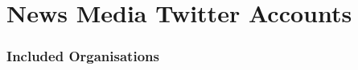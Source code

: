 \chapter{News Media Twitter Accounts\label{app:accounts}}

\subsection{Included Organisations}

\begin{table}[h]
	\caption{}
	\label{appendix:tab:accounts_0}
	\begin{center}
		\resizebox{1 \textwidth}{!}{}
	\end{center}
\end{table}

\begin{table}[h]
	\caption{}
	\label{appendix:tab:accounts_1}
\begin{center}
\resizebox{1 \textwidth}{!}{}
\end{center}
\end{table}

\begin{table}[h]
	\caption{}
	\label{appendix:tab:accounts_2}
	\begin{center}
		\resizebox{1 \textwidth}{!}{}
	\end{center}
\end{table}

\begin{table}[h]
	\caption{}
	\label{appendix:tab:accounts_3}
	\begin{center}
		\resizebox{1 \textwidth}{!}{}
	\end{center}
\end{table}


%
%
%
%
%

